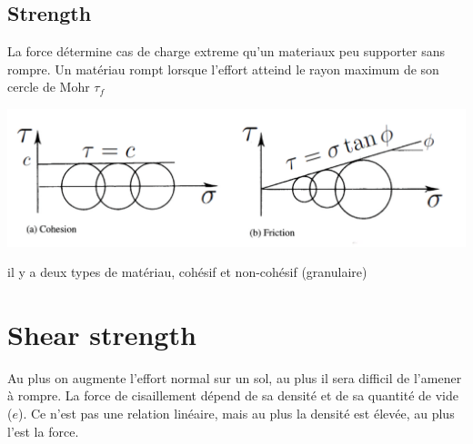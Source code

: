     \subsection{Strength}
    
        La force détermine cas de charge extreme qu'un materiaux peu supporter sans rompre. Un matériau rompt lorsque l'effort atteind le rayon maximum de son cercle de Mohr $\tau_f$ 
        
    \includegraphics[scale=0.5]{Verastegui/images/V9.PNG} 
        
        il y a deux types de matériau, cohésif et non-cohésif (granulaire)

\section{Shear strength}

    Au plus on augmente l'effort normal sur un sol, au plus il sera difficil de l'amener à rompre. La force de cisaillement dépend de sa densité et de sa quantité de vide ($e$). Ce n'est pas une relation linéaire, mais au plus la densité est élevée, au plus l'est la force.
    
